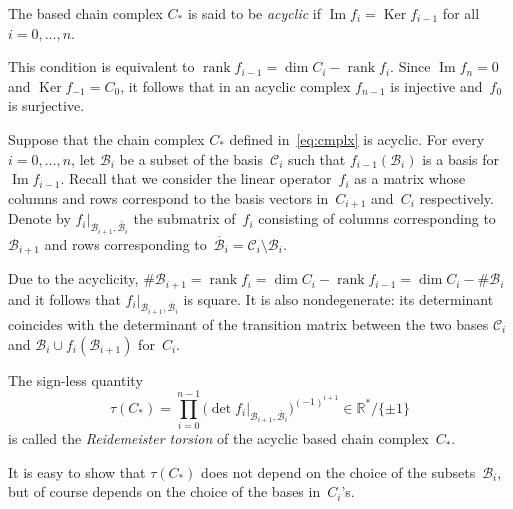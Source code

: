 \documentclass[11pt]{article}
\DeclareMathOperator{\rank}{rank}
\DeclareMathOperator{\Ima}{Im}
\DeclareMathOperator{\Ker}{Ker}
\begin{document}
\begin{definition}
\label{dfn:acycl}
The based chain complex $C_*$ is said to be \emph{acyclic} if $\Ima f_i = \Ker f_{i-1}$ for all~$i = 0, \ldots, n$.
\end{definition}

\begin{remark}
This condition is equivalent to $\rank f_{i-1} = \dim C_i - \rank f_i$. Since $\Ima f_n = 0$ and $\Ker f_{-1} = C_0$, it follows that in an acyclic complex $f_{n-1}$ is injective and~$f_0$ is surjective.
\end{remark}

Suppose that the chain complex $C_*$ def\/ined in~\eqref{eq:cmplx} is acyclic. For every $i = 0, \ldots, n$, let $\mathcal B_i$ be a subset of the basis~$\mathcal C_i$ such that $f_{i-1} (\mathcal B_i)$ is a basis for~$\Ima f_{i-1}$. Recall that we consider the linear operator~$f_i$ as a matrix whose columns and rows correspond to the basis vectors in~$C_{i+1}$ and~$C_i$ respectively. Denote by $f_i|_{\mathcal B_{i+1}, \overline{\mathcal B}_i}$ the submatrix of~$f_i$ consisting of columns corresponding to $\mathcal B_{i+1}$ and rows corresponding to~$\overline{\mathcal B}_i = \mathcal C_i \setminus \mathcal B_i$.

Due to the acyclicity, $\#\mathcal B_{i+1} = \rank f_i = \dim C_i - \rank f_{i-1} = \dim C_i - \#\mathcal B_i$ and it follows that $f_i|_{\mathcal B_{i+1}, \overline{\mathcal B}_i}$ is square. It is also nondegenerate: its determinant coincides with the determinant of the transition matrix between the two bases $\mathcal C_i$ and $\mathcal B_i \cup f_i(\mathcal B_{i+1})$ for~$C_i$.

\begin{definition}
\label{dfn:tors}
The sign-less quantity
\begin{equation}
\label{eq:torsion}
\tau(C_*) = \prod\limits_{i = 0}^{n-1} \bigl(\det f_i|_{\mathcal B_{i+1}, \overline{\mathcal B}_i}\bigr)^{(- 1)^{i+1}} \in \mathbb{R}^* / \{\pm 1\}
\end{equation}
is called the \emph{Reidemeister torsion} of the acyclic based chain complex~$C_*$.
\end{definition}

\begin{remark}
It is easy to show that $\tau(C_*)$ does not depend on the choice of the subsets~$\mathcal B_i$, but of course depends on the choice of the bases in~$C_i$'s.
\end{remark}
\end{document}

